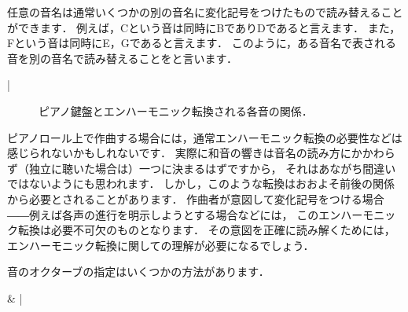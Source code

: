 \documentclass[dvipdfmx,uplatex,b5paper,openany,jbase=12Q,nomag*,textwidth-limit=44%
               ]{gachimuchi}[2020/05/05]
\begin{document}
任意の音名は通常いくつかの別の音名に変化記号をつけたもので読み替えることができます．
例えば，Cという音は同時にB\aSharp でありD\adFlat であると言えます．
また，F\aSharp という音は同時にE\adSharp ，G\aFlat であると言えます．
このように，ある音名で表される音を別の音名で読み替えることをと言います．
\begin{Music}[0.6\linewidth]
  \nostartrule%
  \Startpiece%
  \Notes%
  \en\bar%
  \Notes%
  \en\setdoublebar%
  \endpiece%
\end{Music}
\begin{figure}[ht]
  \centering
  
  \caption{ピアノ鍵盤とエンハーモニック転換される各音の関係．}\vspace{-\Cvs}
\end{figure}

\begin{Yodan}
  ピアノロール上で作曲する場合には，通常エンハーモニック転換の必要性などは感じられないかもしれないです．
  実際に和音の響きは音名の読み方にかかわらず（独立に聴いた場合は）一つに決まるはずですから，
  それはあながち間違いではないようにも思われます．
  しかし，このような転換はおおよそ前後の関係から必要とされることがあります．
  作曲者が意図して変化記号をつける場合――例えば各声の進行を明示しようとする場合などには，
  このエンハーモニック転換は必要不可欠のものとなります．
  その意図を正確に読み解くためには，エンハーモニック転換に関しての理解が必要になるでしょう．
\end{Yodan}

音のオクターブの指定はいくつかの方法があります．
\begin{Music}[0.7\linewidth]
  \indivbarrules
  \indivstartbarrules%
  \Startpiece%
  \znotes
  \en
  \Notes%
  \sk%
  \sk%
  \sk%
  \sk%
  \sk%
  \sk%
  \sk%
  \sk%
  \sk%
  &%
  |\sk%
  \sk%
  \sk%
  \sk%
  \en%
  \endpiece%
\end{Music}
\end{document}
